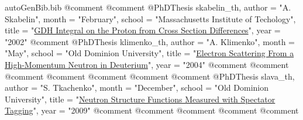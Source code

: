 \begin{filecontents*}{autoGenBib.bib}
@comment %
@comment %
@PhDThesis{ skabelin_th,
	author = "A. Skabelin",
	month = "February",
	school = "Massachusetts Institute of Techology",
	title = "\href{www.jlab.org/Hall-B/general/thesis/skabelin\_thesis.ps‎}{GDH Integral on the Proton from Cross Section Differences}",
	year = "2002"
}
@comment %
@PhDThesis{ klimenko_th,
	author = "A. Klimenko",
	month = "May",
	school = "Old Dominion University",
	title = "\href{https:\//www.jlab.org/Hall-B/general/clas\_thesis.html}{Electron Scattering From a High-Momentum Neutron in Deuterium}",
	year = "2004"
}
@comment %
@comment %
@comment %
@comment %
@comment %
@comment %
@comment %
@PhDThesis{ slava_th,
	author = "S. Tkachenko",
	month = "December",
	school = "Old Dominion University",
	title = "\href{https://www.jlab.org/Hall-B/general/thesis/Tkachenko\_thesis.pdf}{Neutron Structure Functions Measured with Spectator Tagging}",
	year = "2009"
}
@comment %
@comment %
@comment %
@comment %
@comment %


\end{filecontents*}
